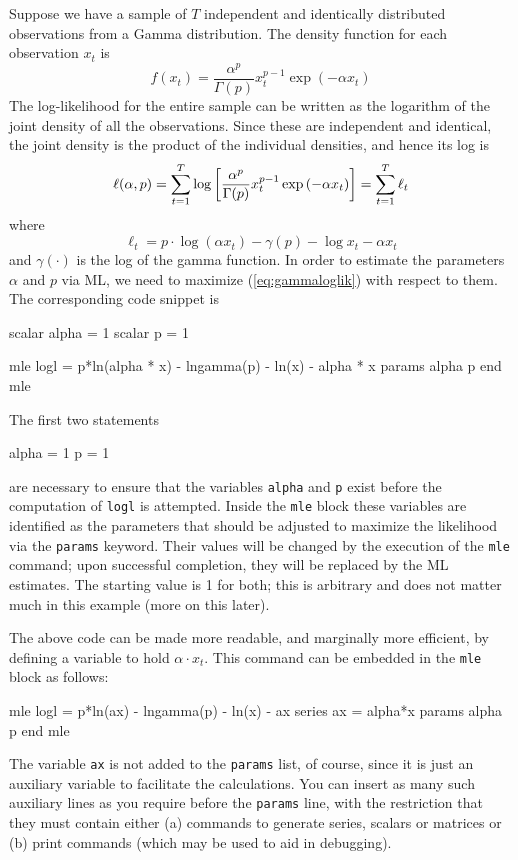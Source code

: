 Suppose we have a sample of $T$ independent and identically
distributed observations from a Gamma distribution. The density
function for each observation $x_t$ is
\begin{equation}
  \label{eq:gammadens}
  f(x_t) = \frac{\alpha^p}{\Gamma(p)} x_t^{p-1} \exp\left({-\alpha
      x_t}\right)
\end{equation}
The log-likelihood for the entire sample can be written as the
logarithm of the joint density of all the observations. Since these
are independent and identical, the joint density is the product of the
individual densities, and hence its log is
\begin{equation}
  \label{eq:gammaloglik}
  \ell(\alpha, p) = \sum_{t=1}^T \log \left[ \frac{\alpha^p}{\Gamma(p)} x_t^{p-1} \exp\left({-\alpha
      x_t}\right) \right] = 
      \sum_{t=1}^T \ell_t
\end{equation}
where 
\[
  \ell_t = p \cdot \log (\alpha x_t) - \gamma(p) - \log x_t - \alpha x_t
\]
and $\gamma(\cdot)$ is the log of the gamma function.  In order to
estimate the parameters $\alpha$ and $p$ via ML, we need to maximize
(\ref{eq:gammaloglik}) with respect to them. The corresponding
 code snippet is

\begin{code}
scalar alpha = 1
scalar p = 1

mle logl =  p*ln(alpha * x) - lngamma(p) - ln(x) - alpha * x 
  params alpha p
end mle 
\end{code}

The first two statements

\begin{code}
alpha = 1
p = 1
\end{code}

are necessary to ensure that the variables \texttt{alpha} and
\texttt{p} exist before the computation of \texttt{logl} is
attempted. Inside the \texttt{mle} block these variables are
identified as the parameters that should be adjusted to maximize the
likelihood via the \texttt{params} keyword.  Their values will be
changed by the execution of the \texttt{mle} command; upon successful
completion, they will be replaced by the ML estimates. The starting
value is 1 for both; this is arbitrary and does not matter much in
this example (more on this later).

The above code can be made more readable, and marginally more
efficient, by defining a variable to hold $\alpha \cdot x_t$. This
command can be embedded in the \texttt{mle} block as follows:
\begin{code}
mle logl =  p*ln(ax) - lngamma(p) - ln(x) - ax 
  series ax = alpha*x
  params alpha p
end mle 
\end{code}
The variable \texttt{ax} is not added to the \texttt{params} list,
of course, since it is just an auxiliary variable to facilitate
the calculations.  You can insert as many such auxiliary lines
as you require before the \texttt{params} line, with the restriction
that they must contain either (a) commands to generate series,
scalars or matrices or (b) print commands (which may be used to
aid in debugging).

